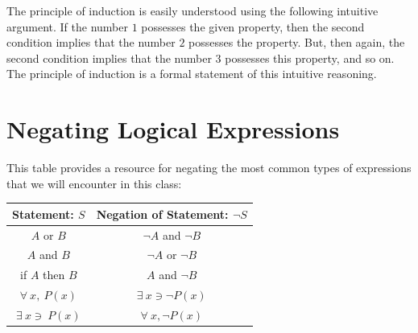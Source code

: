 The principle of induction is easily understood using the following intuitive argument. If the number
$1$ possesses the given property, then the second condition implies that the number $2$ possesses the
property. But, then again, the second condition implies that the number $3$ possesses this property, and so on. The principle of induction is a formal statement of this intuitive reasoning.
\newpage
\section{Negating Logical Expressions}
This table provides a resource for negating the most common types of expressions that we will encounter in this class:
\begin{center}
  \begin{tabular}{|c|c|}\hline
     \textbf{Statement: $S$} & \textbf{Negation of Statement: $\lnot S$}   \\ \hline
     $A$ or $B$ & $\lnot A$ and $\lnot B$  \\ \hline 
     $A$ and $B$ & $\lnot A$ or $\lnot B$  \\ \hline
     if $A$ then $B$ & $A$ and $\lnot B$  \\ \hline
     $\forall \ x, \ P(x)$ & $\exists \ x \ni \lnot P(x)$  \\ \hline
     $\exists \ x \ni \ P(x)$ & $\forall \ x, \lnot P(x)$  \\ \hline
\end{tabular}  
\end{center}



